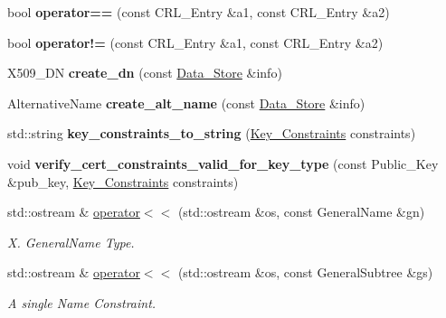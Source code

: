 \begin{DoxyCompactItemize}
bool {\bfseries operator==} (const C\+R\+L\+\_\+\+Entry \&a1, const C\+R\+L\+\_\+\+Entry \&a2)
\item 
\mbox{\label{namespace_botan_a99452f758ce96d50c8e1a3fd2db8bdc7}} 
bool {\bfseries operator!=} (const C\+R\+L\+\_\+\+Entry \&a1, const C\+R\+L\+\_\+\+Entry \&a2)
\item 
\mbox{\label{namespace_botan_ac6359ea952d0cd62ed00fff23910582e}} 
X509\+\_\+\+DN {\bfseries create\+\_\+dn} (const \mbox{\hyperlink{class_botan_1_1_data___store}{Data\+\_\+\+Store}} \&info)
\item 
\mbox{\label{namespace_botan_acf02382223699812ff0016f84f9a891f}} 
Alternative\+Name {\bfseries create\+\_\+alt\+\_\+name} (const \mbox{\hyperlink{class_botan_1_1_data___store}{Data\+\_\+\+Store}} \&info)
\item 
\mbox{\label{namespace_botan_af71f0693cc57262f82c2f2a1813e313d}} 
std\+::string {\bfseries key\+\_\+constraints\+\_\+to\+\_\+string} (\mbox{\hyperlink{namespace_botan_aed0885e5c70627dd43827b966e727654}{Key\+\_\+\+Constraints}} constraints)
\item 
\mbox{\label{namespace_botan_adef993c01e4888e4dd28dbb5f2bf2d21}} 
void {\bfseries verify\+\_\+cert\+\_\+constraints\+\_\+valid\+\_\+for\+\_\+key\+\_\+type} (const Public\+\_\+\+Key \&pub\+\_\+key, \mbox{\hyperlink{namespace_botan_aed0885e5c70627dd43827b966e727654}{Key\+\_\+\+Constraints}} constraints)
\item 
std\+::ostream \& \mbox{\hyperlink{namespace_botan_a253008bbfcdaedb01ffa8cc88fd1b168}{operator$<$$<$}} (std\+::ostream \&os, const General\+Name \&gn)
\begin{DoxyCompactList}\small\item\em X. General\+Name Type. \end{DoxyCompactList}\item 
std\+::ostream \& \mbox{\hyperlink{namespace_botan_a4139683b6cc649ac5a8b6da64dcd60c8}{operator$<$$<$}} (std\+::ostream \&os, const General\+Subtree \&gs)
\begin{DoxyCompactList}\small\item\em A single Name Constraint. \end{DoxyCompactList}\item 

\end{DoxyCompactItemize}
